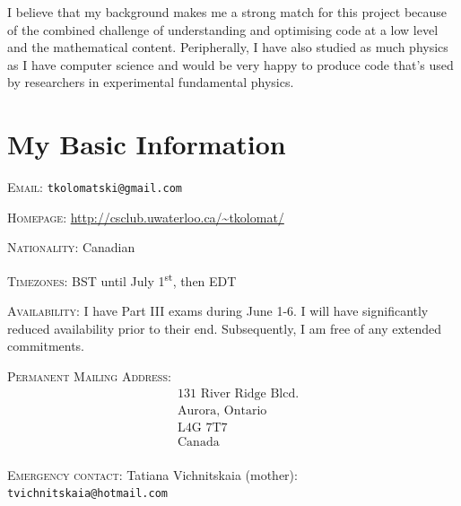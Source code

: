 \documentclass[12pt]{amsart}
\newlength\mystoreparindent
\newenvironment{myparindent}[1]{%
\setlength{\mystoreparindent}{\the\parindent}
\setlength{\parindent}{#1}
}{%
\setlength{\parindent}{\mystoreparindent}
}
\begin{document}
I believe that my background makes me a strong match for this project because of the combined challenge of understanding and optimising code at a low level and the mathematical content. Peripherally, I have also studied as much physics as I have computer science and would be very happy to produce code that's used by researchers in experimental fundamental physics.

\clearpage

\section*{My Basic Information}

\begin{myparindent}{0pt}

\textsc{Email}: \texttt{tkolomatski@gmail.com}

\textsc{Homepage}: \href{http://csclub.uwaterloo.ca/~tkolomat/}{\url{http://csclub.uwaterloo.ca/~tkolomat/}}

\textsc{Nationality}: Canadian

\textsc{Timezones}: BST until July 1\textsuperscript{st}, then EDT

\textsc{Availability}: I have Part III exams during June 1-6. I will have significantly reduced availability prior to their end. Subsequently, I am free of any extended commitments.

\textsc{Permanent Mailing Address}:
\begin{align*}
    &\text{131 River Ridge Blcd.} \\
    &\text{Aurora, Ontario} \\
    &\text{L4G 7T7} \\
    &\text{Canada} \\
\end{align*}

\textsc{Emergency contact}: Tatiana Vichnitskaia (mother): \texttt{tvichnitskaia@hotmail.com}

\end{myparindent}
\end{document}
